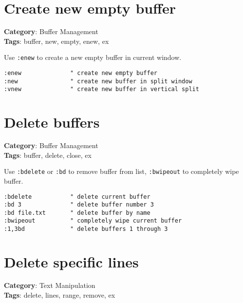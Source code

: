{{{{{\section{Create new empty buffer}

\textbf{Category}: Buffer Management\\ \textbf{Tags}: buffer, new, empty, enew, ex
\vspace{0.5cm}

Use {\footnotesize \Verb§:enew§} to create a new empty buffer in current window.

\begin{Exa*}{}
\begin{Verbatim}[fontsize=\footnotesize, breaklines, breakanywhere]
:enew              " create new empty buffer
:new               " create new buffer in split window
:vnew              " create new buffer in vertical split
\end{Verbatim}
\end{Exa*}

\section{Delete buffers}

\textbf{Category}: Buffer Management\\ \textbf{Tags}: buffer, delete, close, ex
\vspace{0.5cm}

Use {\footnotesize \Verb§:bdelete§} or {\footnotesize \Verb§:bd§} to remove buffer from list, {\footnotesize \Verb§:bwipeout§} to completely wipe buffer.

\begin{Exa*}{}
\begin{Verbatim}[fontsize=\footnotesize, breaklines, breakanywhere]
:bdelete           " delete current buffer
:bd 3              " delete buffer number 3
:bd file.txt       " delete buffer by name
:bwipeout          " completely wipe current buffer
:1,3bd             " delete buffers 1 through 3
\end{Verbatim}
\end{Exa*}

\section{Delete specific lines}

\textbf{Category}: Text Manipulation\\ \textbf{Tags}: delete, lines, range, remove, ex
\vspace{0.5cm}

}}}}}
